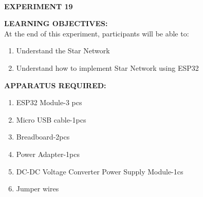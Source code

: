 \documentclass[12pt,a4paper]{article}
\begin{document}
\begin{center}

\textbf{\large \\EXPERIMENT 19 }\\[6pt]
\end{center}

\textbf{\large LEARNING OBJECTIVES:}\\[3pt]
At the end of this experiment, participants will be able to:\vspace{-6mm}\begin{enumerate}
 \setlength\itemsep{-0.3em}
\item Understand the Star Network   \\
\item Understand how to implement Star Network using  ESP32
\end{enumerate}

\textbf{\large APPARATUS REQUIRED:}\\
\vspace{-3mm}
\begin{enumerate}
\setlength\itemsep{-0.3em}
\item ESP32 Module-3 pcs
\item Micro USB cable-1pcs
\item Breadboard-2pcs
\item Power Adapter-1pcs
\item DC-DC Voltage Converter Power Supply Module-1cs
\item Jumper wires
\end{enumerate}
\end{document}
